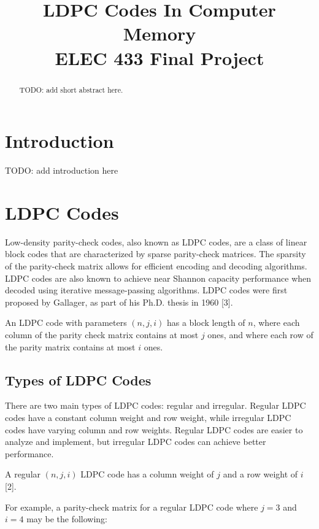 \documentclass[conference]{IEEEtran}
\begin{document}
\title{LDPC Codes In Computer Memory\\
{\large ELEC 433 Final Project}
}

\author{
  \and
}

\maketitle

\begin{abstract}
  TODO: add short abstract here.
\end{abstract}

\section{Introduction}
TODO: add introduction here

\section{LDPC Codes}
Low-density parity-check codes, also known as LDPC codes, are a class of linear block
codes that are characterized by sparse parity-check matrices. The sparsity of
the parity-check matrix allows for efficient encoding and decoding algorithms.
LDPC codes are also known to achieve near Shannon capacity performance when
decoded using iterative message-passing algorithms.
LDPC codes were first proposed by Gallager, as part of his Ph.D. thesis in 1960 [3].

An LDPC code with parameters $(n,j,i)$ has a block length of $n$, where each column of the parity check matrix contains at most $j$ ones, and where each row of the parity matrix contains at most $i$ ones.

\subsection{Types of LDPC Codes}
There are two main types of LDPC codes: regular and irregular. Regular LDPC
codes have a constant column weight and row weight, while irregular LDPC codes
have varying column and row weights. Regular LDPC codes are easier to analyze
and implement, but irregular LDPC codes can achieve better performance.

A regular $(n,j,i)$ LDPC code has a column weight of $j$ and a row weight of $i$ [2].

For example, a parity-check matrix for a regular LDPC code where $j=3$ and $i=4$ may be the following:
\end{document}

